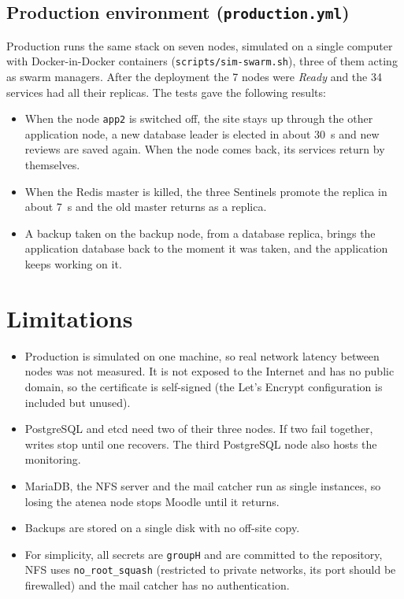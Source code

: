 \documentclass[11pt,a4paper]{article}
\begin{document}
\subsection{Production environment (\texttt{production.yml})}
\label{sec:verified}

Production runs the same stack on seven nodes, simulated on a single computer with
Docker-in-Docker containers (\texttt{scripts/sim-swarm.sh}), three of them acting as swarm
managers. After the deployment the 7 nodes were \emph{Ready} and the 34 services had all
their replicas. The tests gave the following results:
\begin{itemize}
\item When the node \texttt{app2} is switched off, the site stays up through the other
application node, a new database leader is elected in about 30~s and new reviews are saved
again. When the node comes back, its services return by themselves.
\item When the Redis master is killed, the three Sentinels promote the replica in about
7~s and the old master returns as a replica.
\item A backup taken on the backup node, from a database replica, brings the application
database back to the moment it was taken, and the application keeps working on it.
\end{itemize}

\section{Limitations}

\begin{itemize}
\item Production is simulated on one machine, so real network latency between nodes was
not measured. It is not exposed to the Internet and has no public domain, so the
certificate is self-signed (the Let's Encrypt configuration is included but unused).
\item PostgreSQL and etcd need two of their three nodes. If two fail together, writes stop
until one recovers. The third PostgreSQL node also hosts the monitoring.
\item MariaDB, the NFS server and the mail catcher run as single instances, so losing the
atenea node stops Moodle until it returns.
\item Backups are stored on a single disk with no off-site copy.
\item For simplicity, all secrets are \texttt{groupH} and are committed to the repository,
NFS uses \texttt{no\_root\_squash} (restricted to private networks, its port should be
firewalled) and the mail catcher has no authentication.
\end{itemize}
\end{document}

